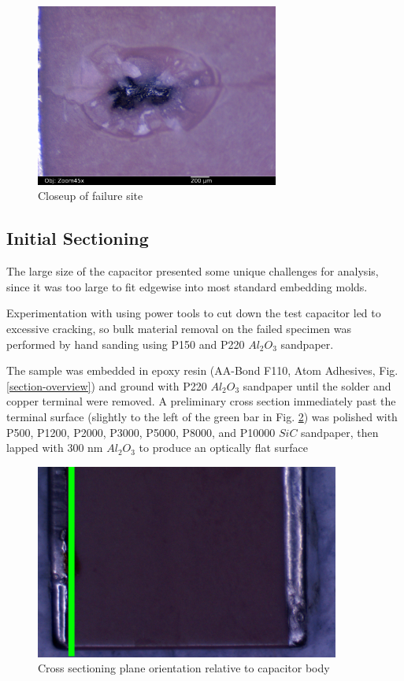 \documentclass{article}
\begin{document}
\begin{figure}[h]
\includegraphics[width=8cm,keepaspectratio]{03-badcap-side_annotated.jpg}
\caption{Closeup of failure site}
\label{fail-closeup}
\end{figure}

\FloatBarrier

\subsection{Initial Sectioning}

The large size of the capacitor presented some unique challenges for analysis, since it was too large to fit edgewise
into most standard embedding molds.

Experimentation with using power tools to cut down the test capacitor led to excessive cracking, so bulk material
removal on the failed specimen was performed by hand sanding using P150 and P220 $Al_2O_3$ sandpaper.

The sample was embedded in epoxy resin (AA-Bond F110, Atom Adhesives, Fig.\ref{section-overview}) and ground with P220
$Al_2O_3$ sandpaper until the solder and copper terminal were removed. A preliminary cross section immediately past the
terminal surface (slightly to the left of the green bar in Fig. \ref{section-plane}) was polished with P500, P1200,
P2000, P3000, P5000, P8000, and P10000 $SiC$ sandpaper, then lapped with 300 nm $Al_2O_3$ to produce an optically flat
surface

\begin{figure}[h]
\includegraphics[width=10cm,keepaspectratio]{section-plane.jpg}
\caption{Cross sectioning plane orientation relative to capacitor body}
\label{section-plane}
\end{figure}
\end{document}
